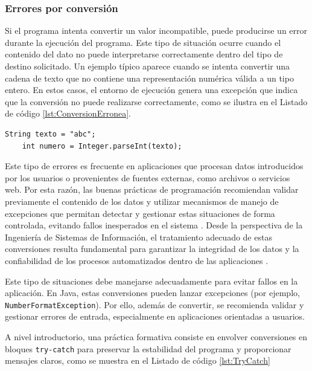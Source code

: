 \documentclass[12pt,twoside]{book}
\begin{document}
					\subsubsection{Errores por conversión}
						\noindent
						Si el programa intenta convertir un valor incompatible, puede producirse un error durante la ejecución del programa. Este tipo de situación ocurre cuando el contenido del dato no puede interpretarse correctamente dentro del tipo de destino solicitado. Un ejemplo típico aparece cuando se intenta convertir una cadena de texto que no contiene una representación numérica válida a un tipo entero. En estos casos, el entorno de ejecución genera una excepción que indica que la conversión no puede realizarse correctamente, como se ilustra en el Listado de código \ref{lst:ConversionErronea}. 
												
						\begin{lstlisting}[style=Java,caption={Conversión Errónea de Datos.},label={lst:ConversionErronea}]
	String texto = "abc";
	int numero = Integer.parseInt(texto);\end{lstlisting}
						
						Este tipo de errores es frecuente en aplicaciones que procesan datos introducidos por los usuarios o provenientes de fuentes externas, como archivos o servicios web. Por esta razón, las buenas prácticas de programación recomiendan validar previamente el contenido de los datos y utilizar mecanismos de manejo de excepciones que permitan detectar y gestionar estas situaciones de forma controlada, evitando fallos inesperados en el sistema \cite{Bloch2018EffectiveJava,Sebesta2018Concepts}. Desde la perspectiva de la Ingeniería de Sistemas de Información, el tratamiento adecuado de estas conversiones resulta fundamental para garantizar la integridad de los datos y la confiabilidad de los procesos automatizados dentro de las aplicaciones \cite{Pressman2019Software,Sommerville2015Software}.
						
						\noindent
						Este tipo de situaciones debe manejarse adecuadamente para evitar fallos en la aplicación. En Java, estas conversiones pueden lanzar excepciones (por ejemplo, \texttt{NumberFormatException}). Por ello, además de convertir, se recomienda validar y gestionar errores de entrada, especialmente en aplicaciones orientadas a usuarios.
						
						A nivel introductorio, una práctica formativa consiste en envolver conversiones en bloques \texttt{try-catch} para preservar la estabilidad del programa y proporcionar mensajes claros, como se muestra en el Listado de código \ref{lst:TryCatch}
						 
\end{document}
